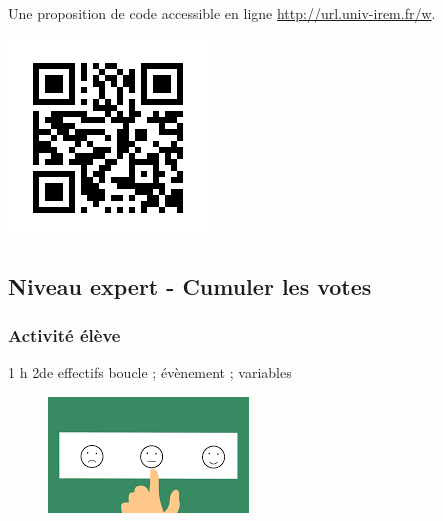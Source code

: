 \begin{remarque}
    Une proposition de code accessible en ligne
    \url{http://url.univ-irem.fr/w}.
    \begin{center}
        \href {http://url.univ-irem.fr/w}{ \includegraphics[width=0.25\linewidth]{res/mb-jpo-code01-qr.png}}
    \end{center}
\end{remarque}




\newpage


\subsection{Niveau expert - Cumuler les votes}

\subsubsection{Activité élève}

\cartouche
{1 h}         %
{2de}           %
{effectifs}        %
{}     %
{boucle ; évènement ; variables}       %


\begin{figure}
    \includegraphics[width=\linewidth]{res/vote.png}
\end{figure}

